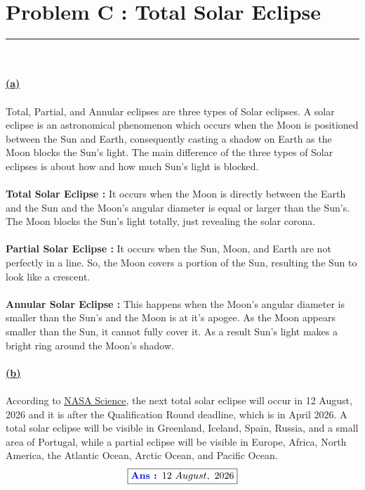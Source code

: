 \documentclass{article}
\begin{document}
\section*{Problem C : Total Solar Eclipse}
\vspace{-10pt} \textcolor{cyan}{\rule{8cm}{0.6pt}}\\\\
{\Large \bfseries \textcolor{blue!90!black}{\ul{(a)}}}\\\\
 Total, Partial, and Annular eclipses are three types of Solar eclipses. A solar eclipse is an astronomical phenomenon which occurs when the Moon is positioned between the Sun and Earth, consequently casting a shadow on Earth as the Moon blocks the Sun's light. The main difference of the three types of Solar eclipses is about how and how much Sun's light is blocked.\\\\
\textbf{Total Solar Eclipse :} It occurs when the Moon is directly between the Earth and the Sun and the Moon's angular diameter is equal or larger than the Sun's. The Moon blocks the Sun's light totally, just revealing the solar corona. \\\\
\textbf{Partial Solar Eclipse :} It occurs when the Sun, Moon, and Earth are not perfectly in a line. So, the Moon covers a portion of the Sun, resulting the Sun to look like a crescent.  \\\\
\textbf{Annular Solar Eclipse :} This happens when the Moon's angular diameter is smaller than the Sun's and the Moon is at it's apogee. As the Moon appears smaller than the Sun, it cannot fully cover it. As a result Sun's light makes a bright ring around the Moon's shadow.\\\\
\newpage
\noindent
{\Large \bfseries \textcolor{blue!90!black}{\ul{(b)}}}\\\\
According to \href{https://science.nasa.gov/eclipses/future-eclipses/}{NASA Science}, the next total solar eclipse will occur in 12 August, 2026 and it is after the Qualification Round deadline, which is in April 2026. A total solar eclipse will be visible in Greenland, Iceland, Spain, Russia, and a small area of Portugal, while a partial eclipse will be visible in Europe, Africa, North America, the Atlantic Ocean, Arctic Ocean, and Pacific Ocean. \\
\[
\boxed{\textcolor{blue!90!black}{\textbf{Ans : }} 12~August,~2026}
\]\\\\
\end{document}
